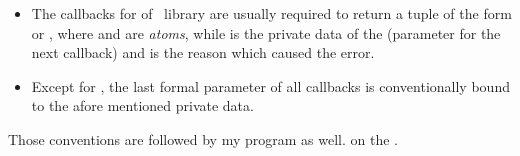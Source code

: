 \begin{itemize}

    \item   The callbacks for  of \OTP\ library are
            usually required to return a tuple of the form 
            or , where  and  are
            \emph{atoms}, while  is the private data of the
             (parameter for the next callback)
            and  is the reason which caused the error.

    \item   Except for , the last formal parameter of all
             callbacks is conventionally
            bound to the afore mentioned private data.
\end{itemize}

Those conventions are followed by my program as well.
 on the .
